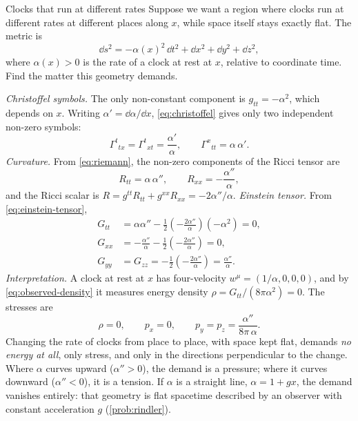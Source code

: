 \begin{example}{Clocks that run at different rates}\label{ex:lapse}
Suppose we want a region where clocks run at different rates at different
places along $x$, while space itself stays exactly flat. The metric is
\begin{equation}
  \dd s^{2} = -\alpha(x)^{2}\,\dd t^{2} + \dd x^{2} + \dd y^{2} + \dd z^{2},
  \label{eq:lapse-metric}
\end{equation}
where $\alpha(x) > 0$ is the rate of a clock at rest at $x$, relative to
coordinate time. Find the matter this geometry demands.

\solution \emph{Christoffel symbols.} The only non-constant component is
$g_{tt} = -\alpha^{2}$, which depends on $x$. Writing $\alpha' = \dd\alpha/\dd x$,
\cref{eq:christoffel} gives only two independent non-zero symbols:
\begin{equation*}
  \Gamma^{t}{}_{tx} = \Gamma^{t}{}_{xt} = \frac{\alpha'}{\alpha},
  \qquad
  \Gamma^{x}{}_{tt} = \alpha\,\alpha' .
\end{equation*}
\emph{Curvature.} From \cref{eq:riemann}, the non-zero components of the Ricci
tensor are
\begin{equation*}
  R_{tt} = \alpha\,\alpha'', \qquad R_{xx} = -\frac{\alpha''}{\alpha},
\end{equation*}
and the Ricci scalar is $R = g^{tt}R_{tt} + g^{xx}R_{xx} = -2\alpha''/\alpha$.
\emph{Einstein tensor.} From \cref{eq:einstein-tensor},
\begin{align*}
  G_{tt} &= \alpha\alpha'' - \tfrac{1}{2}\left(-\frac{2\alpha''}{\alpha}\right)(-\alpha^{2}) = 0,\\
  G_{xx} &= -\frac{\alpha''}{\alpha} - \tfrac{1}{2}\left(-\frac{2\alpha''}{\alpha}\right) = 0,\\
  G_{yy} &= G_{zz} = -\tfrac{1}{2}\left(-\frac{2\alpha''}{\alpha}\right) = \frac{\alpha''}{\alpha}.
\end{align*}
\emph{Interpretation.} A clock at rest at $x$ has four-velocity
$w^{\mu} = (1/\alpha, 0, 0, 0)$, and by \cref{eq:observed-density} it measures
energy density $\rho = G_{tt}/(8\pi\alpha^{2}) = 0$. The stresses are
\begin{equation}
  \rho = 0, \qquad p_{x} = 0, \qquad p_{y} = p_{z} = \frac{\alpha''}{8\pi\,\alpha}.
  \label{eq:lapse-demand}
\end{equation}
\discussion Changing the rate of clocks from place to place, with space kept
flat, demands \emph{no energy at all}, only stress, and only in the directions
perpendicular to the change. Where $\alpha$ curves upward ($\alpha'' > 0$), the
demand is a pressure; where it curves downward ($\alpha'' < 0$), it is a tension.
If $\alpha$ is a straight line, $\alpha = 1 + gx$, the demand vanishes entirely:
that geometry is flat spacetime described by an observer with constant
acceleration $g$ (\cref{prob:rindler}).
\end{example}

